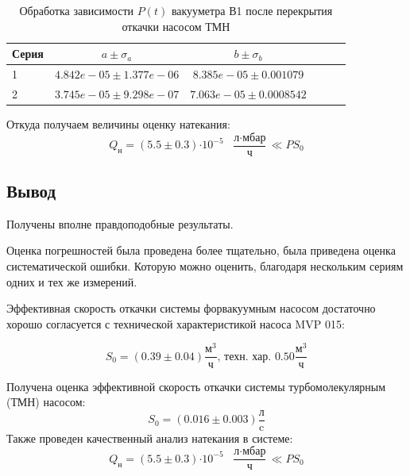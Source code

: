 \documentclass[12pt,a4paper]{article}
\newcommand{\e}[1]{\text{$\cdot10^{#1}$}}
\begin{document}
\begin{table}[H]	
	\caption{Обработка зависимости $P(t)$ вакууметра В1 после перекрытия откачки насосом ТМН}
	\label{tab:natek}
	\centering
	\footnotesize
	\begin{tabular}{lccccc}
		\toprule
		
		Серия & $a \pm \sigma_a$ & $b \pm \sigma_b$ \\
		\midrule
		1&$4.842e-05 \pm 1.377e-06$     &    $8.385e-05 \pm 0.001079$  \\
		2&$3.745e-05 \pm 9.298e-07$     &    $7.063e-05 \pm 0.0008542$ \\
		\bottomrule
	\end{tabular}
\end{table}


Откуда получаем величины оценку натекания: 
$$Q_{\text{н}} = (5.5 \pm 0.3)\e{-5}\text{ }\frac{\text{л}\cdot\text{мбар}}{\text{ч}}\ll PS_0$$

\subsection*{Вывод}

Получены вполне правдоподобные результаты. 

Оценка погрешностей была проведена более тщательно, была приведена оценка систематической ошибки. Которую можно оценить, благодаря нескольким сериям одних и тех же измерений.

Эффективная скорость откачки системы форвакуумным насосом достаточно хорошо согласуется с технической характеристикой насоса MVP 015:

$$S_0 = (0.39 \pm 0.04) \frac{\text{м}^3}{\text{ч}}\text{, техн. хар. } 0.50\frac{\text{м}^3}{\text{ч}}$$

Получена оценка эффективной скорость откачки системы турбомолекулярным (ТМН) насосом:
$$S_0 = (0.016 \pm 0.003) \frac{\text{л}}{\text{c}}$$
Также проведен качественный анализ натекания в системе:
$$Q_{\text{н}} = (5.5 \pm 0.3)\e{-5}\text{ }\frac{\text{л}\cdot\text{мбар}}{\text{ч}}\ll PS_0$$
\end{document}
